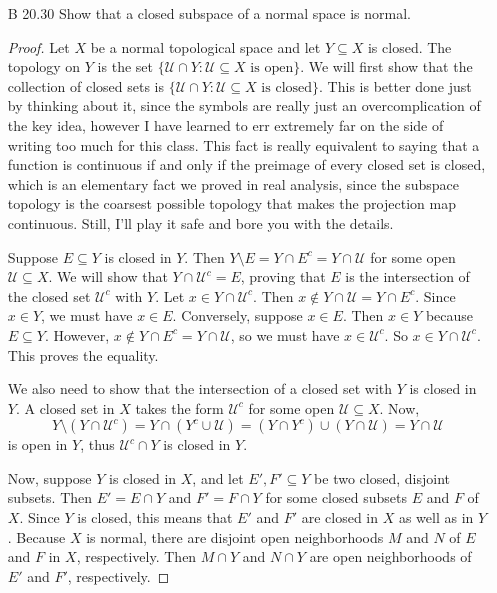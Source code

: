 \documentclass[10pt]{article}
\newcommand{\U}{\mathcal{U}}
\begin{document}
\begin{enumerate}
\begin{proof}
\end{proof}

\item[B 20.30] Show that a closed subspace of a normal space is normal.

\begin{proof}
Let $X$ be a normal topological space and let $Y \subseteq X$ is closed.  The topology on $Y$ is the set $\{\U \cap Y : \U \subseteq X \text{ is open} \}$.  We will first show that the collection of closed sets is $\{\U \cap Y : \U \subseteq X \text{ is closed} \}$.  This is better done just by thinking about it, since the symbols are really just an overcomplication of the key idea, however I have learned to err extremely far on the side of writing too much for this class.  This fact is really equivalent to saying that a function is continuous if and only if the preimage of every closed set is closed, which is an elementary fact we proved in real analysis, since the subspace topology is the coarsest possible topology that makes the projection map continuous.  Still, I'll play it safe and bore you with the details.

Suppose $E \subseteq Y$ is closed in $Y$.  Then $Y \setminus E = Y \cap E^c = Y \cap \U$ for some open $\U \subseteq X$.  We will show that $Y \cap \U^c = E$, proving that $E$ is the intersection of the closed set $\U^c$ with $Y$.  Let $x \in Y \cap \U^c$.  Then $x \not \in Y \cap \U = Y \cap E^c$.  Since $x \in Y$, we must have $x \in E$.  Conversely, suppose $x \in E$.  Then $x \in Y$ because $E \subseteq Y$.  However, $x \not \in Y \cap E^c = Y \cap \U$, so we must have $x \in \U^c$.  So $x \in Y \cap \U^c$.  This proves the equality.

We also need to show that the intersection of a closed set with $Y$ is closed in $Y$.  A closed set in $X$ takes the form $\U^c$ for some open $\U \subseteq X$.  Now,
$$Y \setminus (Y \cap \U^c)= Y \cap (Y^c \cup \U) = (Y \cap Y^c) \cup (Y \cap \U) = Y \cap \U$$
is open in $Y$, thus $\U^c \cap Y$ is closed in $Y$.

Now, suppose $Y$ is closed in $X$, and let $E',F' \subseteq Y$ be two closed, disjoint subsets.  Then $E' = E \cap Y$ and $F' = F \cap Y$ for some closed subsets $E$ and $F$ of $X$.  Since $Y$ is closed, this means that $E'$ and $F'$ are closed in $X$ as well as in $Y$.  Because $X$ is normal, there are disjoint open neighborhoods $M$ and $N$ of $E$ and $F$ in $X$, respectively.  Then $M \cap Y$ and $N \cap Y$ are open neighborhoods of $E'$ and $F'$, respectively.


\end{proof}
\end{enumerate}
\end{document}
